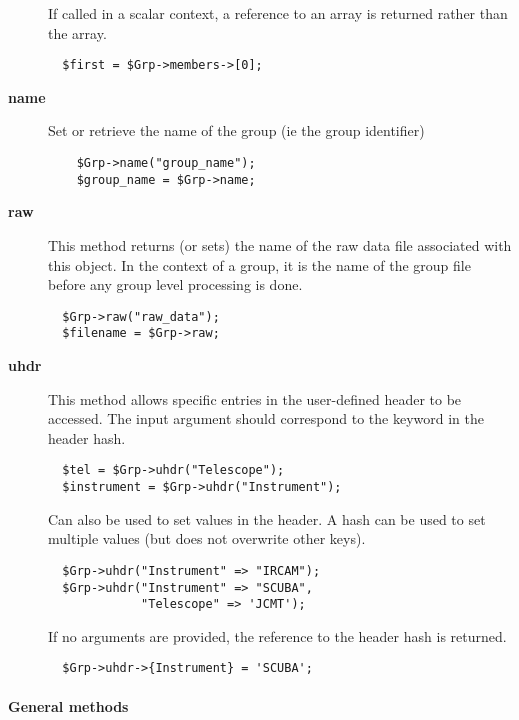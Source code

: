 \begin{description}
If called in a scalar context, a reference to an array is returned
rather than the array.

\begin{verbatim}
  $first = $Grp->members->[0];
\end{verbatim}
\item[\textbf{name}] \mbox{}

Set or retrieve the name of the group (ie the 
group identifier)

\begin{verbatim}
    $Grp->name("group_name");
    $group_name = $Grp->name;
\end{verbatim}
\item[\textbf{raw}] \mbox{}

This method returns (or sets) the name of the raw data file
associated with this object. In the context of a group, it is
the name of the group file before any group level processing is
done.

\begin{verbatim}
  $Grp->raw("raw_data");
  $filename = $Grp->raw;
\end{verbatim}
\item[\textbf{uhdr}] \mbox{}

This method allows specific entries in the user-defined header to be 
accessed. The input argument should correspond to the keyword in the header
hash.

\begin{verbatim}
  $tel = $Grp->uhdr("Telescope");
  $instrument = $Grp->uhdr("Instrument");
\end{verbatim}


Can also be used to set values in the header.
A hash can be used to set multiple values (but does not overwrite
other keys).

\begin{verbatim}
  $Grp->uhdr("Instrument" => "IRCAM");
  $Grp->uhdr("Instrument" => "SCUBA", 
             "Telescope" => 'JCMT');
\end{verbatim}


If no arguments are provided, the reference to the header hash
is returned.

\begin{verbatim}
  $Grp->uhdr->{Instrument} = 'SCUBA';
\end{verbatim}
\end{description}
\paragraph*{General methods\label{ORAC::Group_General_methods}}

